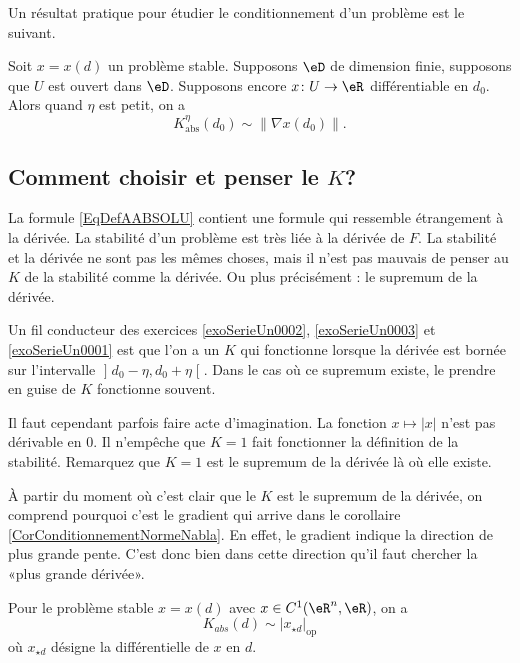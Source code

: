 Un résultat pratique pour étudier le conditionnement d'un problème est le suivant.
\begin{corollary}		\label{CorConditionnementNormeNabla}
	Soit $x=x(d)$ un problème stable. Supposons $\eD$ de dimension finie, supposons que $U$ est ouvert dans $\eD$. Supposons encore $x\colon U\to \eR$ différentiable en $d_0$. Alors quand $\eta$ est petit, on a
	\begin{equation}
		K_{\text{abs}}^{\eta}(d_0)\sim \| \nabla x(d_0) \|.
	\end{equation}
\end{corollary}

\subsection{Comment choisir et penser le $K$?}

La formule \eqref{EqDefAABSOLU} contient une formule qui ressemble étrangement à la dérivée. La stabilité d'un problème est très liée à la dérivée de $F$. La stabilité et la dérivée ne sont pas les mêmes choses, mais il n'est pas mauvais de penser au $K$ de la stabilité comme la dérivée. Ou plus précisément : le supremum de la dérivée.

Un fil conducteur des exercices \ref{exoSerieUn0002}, \ref{exoSerieUn0003} et \ref{exoSerieUn0001} est que l'on a un $K$ qui fonctionne lorsque la dérivée est bornée sur l'intervalle $\mathopen] d_0-\eta , d_0+\eta \mathclose[$. Dans le cas où ce supremum existe, le prendre en guise de $K$ fonctionne souvent.

Il faut cependant parfois faire acte d'imagination. La fonction $x\mapsto| x |$ n'est pas dérivable en $0$. Il n'empêche que $K=1$ fait fonctionner la définition de la stabilité. Remarquez que $K=1$ est le supremum de la dérivée là où elle existe.

À partir du moment où c'est clair que le $K$ est le supremum de la dérivée, on comprend pourquoi c'est le gradient qui arrive dans le corollaire \ref{CorConditionnementNormeNabla}. En effet, le gradient indique la direction de plus grande pente. C'est donc bien dans cette direction qu'il faut chercher la «plus grande dérivée».


\begin{proposition}	
	Pour le problème stable $x=x(d)$ avec $x\in C^1(\eR^n,\eR)$, on a
	\begin{equation}
		K_{abs}(d)\sim|x_{\star d}|_{\mbox{op}}
	\end{equation}
	où $x_{\star d}$ désigne la différentielle de $x$ en $d$.
\end{proposition}

